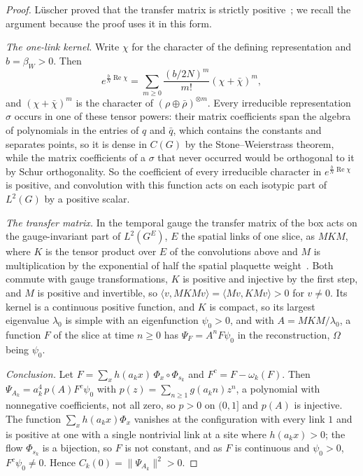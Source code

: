 \documentclass[11pt]{amsart}
\theoremstyle{definition}
\theoremstyle{remark}
\numberwithin{equation}{section}
\newcommand{\ip}[2]{\langle #1,#2\rangle}
\begin{document}
\begin{proof}
L\"uscher proved that the transfer matrix is strictly positive~\cite{Lus77};
we recall the argument because the proof uses it in this form.

\emph{The one-link kernel.} Write $\chi$ for the character of the defining
representation and $b=\beta_W>0$. Then
\[
e^{\frac bN\operatorname{Re}\chi}=\sum_{m\ge0}\frac{(b/2N)^m}{m!}
(\chi+\bar\chi)^m ,
\]
and $(\chi+\bar\chi)^m$ is the character of $(\rho\oplus\bar\rho)^{\otimes m}$.
Every irreducible representation $\sigma$ occurs in one of these tensor
powers: their matrix coefficients span the algebra of polynomials in the
entries of $q$ and $\bar q$, which contains the constants and separates points,
so it is dense in $C(G)$ by the Stone--Weierstrass theorem, while the matrix
coefficients of a $\sigma$ that never occurred would be orthogonal to it by
Schur orthogonality. So the coefficient of every irreducible character in
$e^{\frac bN\operatorname{Re}\chi}$ is positive, and convolution with this
function acts on each isotypic part of $L^2(G)$ by a positive scalar.

\emph{The transfer matrix.} In the temporal gauge the transfer matrix of the
box acts on the gauge-invariant part of $L^2(G^{E})$, $E$ the spatial links
of one slice, as $M K M$, where $K$ is the tensor product over $E$ of the
convolutions above and $M$ is multiplication by the exponential of half the
spatial plaquette weight~\cite{Lus77,OSei78}. Both commute with gauge
transformations, $K$ is positive and injective by the first step, and $M$ is
positive and invertible, so $\ip v{MKMv}=\ip{Mv}{KMv}>0$ for $v\ne0$. Its
kernel is a continuous positive function, and $K$ is compact, so its largest eigenvalue $\lambda_0$ is
simple with an eigenfunction $\psi_0>0$, and with $A=MKM/\lambda_0$, a
function $F$ of the slice at time $n\ge0$ has $\Psi_F=A^nF\psi_0$ in the
reconstruction, $\Omega$ being $\psi_0$.

\emph{Conclusion.} Let $F=\sum_xh(a_kx)\,\Phi_x\circ\Phi_{s_k}$ and
$F^c=F-\omega_k(F)$. Then $\Psi_{A_k}=a_k^4\,p(A)F^c\psi_0$ with
$p(z)=\sum_{n\ge1}g(a_kn)z^n$, a polynomial with nonnegative coefficients,
not all zero, so $p>0$ on $(0,1]$ and $p(A)$ is injective. The function
$\sum_xh(a_kx)\Phi_x$ vanishes at the configuration with every link $1$ and is
positive at one with a single nontrivial link at a site where $h(a_kx)>0$; the
flow $\Phi_{s_k}$ is a bijection, so $F$ is not constant, and as $F$ is
continuous and $\psi_0>0$, $F^c\psi_0\ne0$. Hence $C_k(0)=\|\Psi_{A_k}\|^2>0$.
\end{proof}
\end{document}
